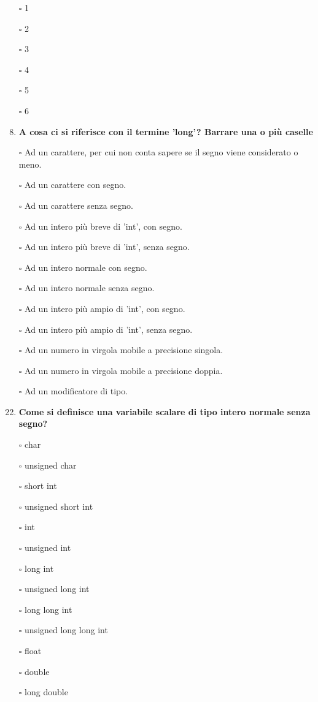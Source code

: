 \documentclass[9pt]{article}
\begin{document}
\begin{enumerate}
\item[$\square$] 1
\item[$\square$] 2
\item[$\square$] 3
\item[$\square$] 4
\item[$\square$] 5
\item[$\square$] 6
\item [\nonumber]
\item{\bf A cosa ci si riferisce con il termine 'long'? Barrare una o pi\`{u} caselle}

\item[$\square$] Ad un carattere, per cui non conta sapere se il segno viene considerato o meno.
\item[$\square$] Ad un carattere con segno.
\item[$\square$] Ad un carattere senza segno.
\item[$\square$] Ad un intero pi\`{u} breve di 'int', con segno.
\item[$\square$] Ad un intero pi\`{u} breve di 'int', senza segno.
\item[$\square$] Ad un intero normale con segno.
\item[$\square$] Ad un intero normale senza segno.
\item[$\square$] Ad un intero pi\`{u} ampio di 'int', con segno.
\item[$\square$] Ad un intero pi\`{u} ampio di 'int', senza segno.
\item[$\square$] Ad un numero in virgola mobile a precisione singola.
\item[$\square$] Ad un numero in virgola mobile a precisione doppia.
\item[$\square$] Ad un modificatore di tipo.
\item [\nonumber]
 \item {\bf Come si definisce una variabile scalare di tipo intero normale senza segno?}
 
\item[$\square$] char
\item[$\square$] unsigned char
\item[$\square$] short int
\item[$\square$] unsigned short int
\item[$\square$] int
\item[$\square$] unsigned int
\item[$\square$] long int
\item[$\square$] unsigned long int
\item[$\square$] long long int
\item[$\square$] unsigned long long int
\item[$\square$] float
\item[$\square$] double
\item[$\square$] long double
\item [\nonumber]


\end{enumerate}
\end{document}
